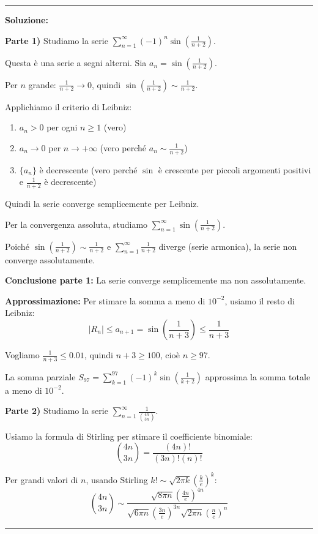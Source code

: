 \documentclass[12pt, a4paper]{article}
\newenvironment{solution}
{\par\noindent\rule{\textwidth}{0.4pt}\par\textbf{Soluzione:}\medskip\par}
{\par\rule{\textwidth}{0.4pt}\par\bigskip}
\begin{document}
\begin{solution}
\textbf{Parte 1)} Studiamo la serie $\displaystyle\sum_{n=1}^{\infty} (-1)^{n} \sin\left(\frac{1}{n+2}\right)$.

Questa è una serie a segni alterni. Sia $a_n = \sin\left(\frac{1}{n+2}\right)$.

Per $n$ grande: $\frac{1}{n+2} \to 0$, quindi $\sin\left(\frac{1}{n+2}\right) \sim \frac{1}{n+2}$.

Applichiamo il criterio di Leibniz:
\begin{enumerate}
    \item $a_n > 0$ per ogni $n \geq 1$ (vero)
    \item $a_n \to 0$ per $n \to +\infty$ (vero perché $a_n \sim \frac{1}{n+2}$)
    \item $\{a_n\}$ è decrescente (vero perché $\sin$ è crescente per piccoli argomenti positivi e $\frac{1}{n+2}$ è decrescente)
\end{enumerate}

Quindi la serie converge semplicemente per Leibniz.

Per la convergenza assoluta, studiamo $\displaystyle\sum_{n=1}^{\infty} \sin\left(\frac{1}{n+2}\right)$.

Poiché $\sin\left(\frac{1}{n+2}\right) \sim \frac{1}{n+2}$ e $\displaystyle\sum_{n=1}^{\infty} \frac{1}{n+2}$ diverge (serie armonica), la serie non converge assolutamente.

\textbf{Conclusione parte 1:} La serie converge semplicemente ma non assolutamente.

\textbf{Approssimazione:} Per stimare la somma a meno di $10^{-2}$, usiamo il resto di Leibniz:
\[
|R_n| \leq a_{n+1} = \sin\left(\frac{1}{n+3}\right) \leq \frac{1}{n+3}
\]

Vogliamo $\frac{1}{n+3} \leq 0.01$, quindi $n+3 \geq 100$, cioè $n \geq 97$.

La somma parziale $S_{97} = \sum_{k=1}^{97} (-1)^k \sin\left(\frac{1}{k+2}\right)$ approssima la somma totale a meno di $10^{-2}$.

\vspace{0.5cm}

\textbf{Parte 2)} Studiamo la serie $\displaystyle\sum_{n=1}^{\infty} \frac{1}{\binom{4n}{3n}}$.

Usiamo la formula di Stirling per stimare il coefficiente binomiale:
\[
\binom{4n}{3n} = \frac{(4n)!}{(3n)!(n)!}
\]

Per grandi valori di $n$, usando Stirling $k! \sim \sqrt{2\pi k} \left(\frac{k}{e}\right)^k$:
\[
\binom{4n}{3n} \sim \frac{\sqrt{8\pi n} \left(\frac{4n}{e}\right)^{4n}}{\sqrt{6\pi n} \left(\frac{3n}{e}\right)^{3n} \sqrt{2\pi n} \left(\frac{n}{e}\right)^n}
\]


\end{solution}
\end{document}
